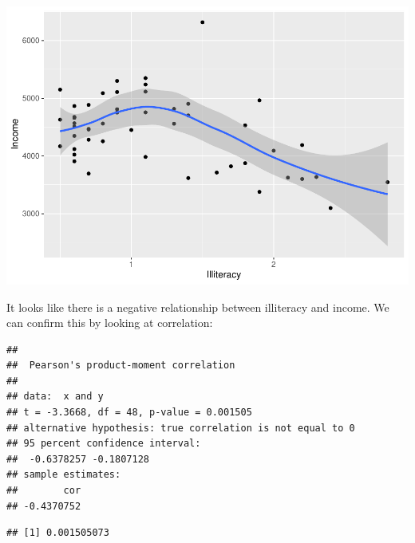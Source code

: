 \documentclass[
]{book}
\newenvironment{Shaded}{\begin{snugshade}}{\end{snugshade}}
\newcommand{\FunctionTok}[1]{\textcolor[rgb]{0.13,0.29,0.53}{\textbf{#1}}}
\newcommand{\NormalTok}[1]{#1}
\newcommand{\OtherTok}[1]{\textcolor[rgb]{0.56,0.35,0.01}{#1}}
\newcommand{\SpecialCharTok}[1]{\textcolor[rgb]{0.81,0.36,0.00}{\textbf{#1}}}
\begin{document}
\includegraphics{_main_files/figure-latex/states-geomsmooth-1.pdf}

It looks like there is a negative relationship between illiteracy and income. We can confirm this by looking at correlation:

\begin{Shaded}
\end{Shaded}

\begin{verbatim}
## 
##  Pearson's product-moment correlation
## 
## data:  x and y
## t = -3.3668, df = 48, p-value = 0.001505
## alternative hypothesis: true correlation is not equal to 0
## 95 percent confidence interval:
##  -0.6378257 -0.1807128
## sample estimates:
##        cor 
## -0.4370752
\end{verbatim}

\begin{Shaded}
\end{Shaded}

\begin{verbatim}
## [1] 0.001505073
\end{verbatim}
\end{document}
